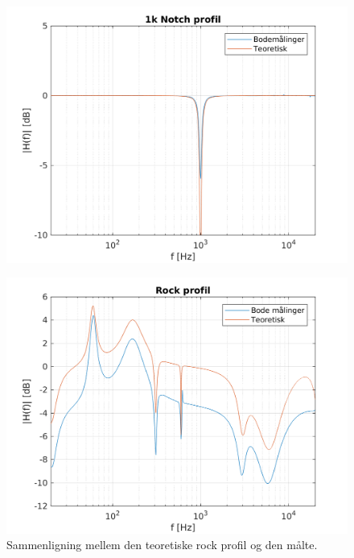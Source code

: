 \begin{figure}[h]
    \centering
    \includegraphics[]{matlabdemo/test/eq_1knotch.png}
\end{figure}

\begin{figure}[h]
\includegraphics[]{matlabdemo/test/eq_rock.png}
\caption{Sammenligning mellem den teoretiske rock profil og den målte.}
\end{figure}




